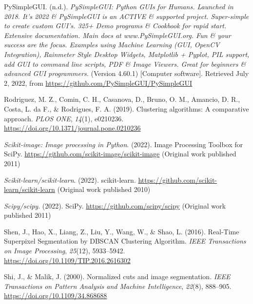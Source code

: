 \documentclass[
  12pt,
]{book}
\newlength{\cslhangindent}
\newlength{\cslentryspacingunit} %
\newenvironment{CSLReferences}[2] %
 {%
  \setlength{\parindent}{0pt}
  \ifodd #1
  \let\oldpar\par
  \def\par{\hangindent=\cslhangindent\oldpar}
  \fi
  \setlength{\parskip}{#2\cslentryspacingunit}
 }%
 {}
\begin{document}
\begin{CSLReferences}{1}{0}
\leavevmode{}%
PySimpleGUI. (n.d.). \emph{{PySimpleGUI}: {Python GUIs} for {Humans}. {Launched} in 2018. {It}'s 2022 \& {PySimpleGUI} is an {ACTIVE} \& supported project. {Super-simple} to create custom {GUI}'s. 325+ {Demo} programs \& {Cookbook} for rapid start. {Extensive} documentation. {Main} docs at www.{PySimpleGUI}.org. {Fun} \& your success are the focus. {Examples} using {Machine Learning} ({GUI}, {OpenCV Integration}), {Rainmeter Style Desktop Widgets}, {Matplotlib} + {Pyplot}, {PIL} support, add {GUI} to command line scripts, {PDF} \& {Image Viewers}. {Great} for beginners \& advanced {GUI} programmers.} (Version 4.60.1) {[}Computer software{]}. Retrieved July 2, 2022, from \url{https://github.com/PySimpleGUI/PySimpleGUI}

\leavevmode{}%
Rodriguez, M. Z., Comin, C. H., Casanova, D., Bruno, O. M., Amancio, D. R., Costa, L. da F., \& Rodrigues, F. A. (2019). Clustering algorithms: {A} comparative approach. \emph{PLOS ONE}, \emph{14}(1), e0210236. \url{https://doi.org/10.1371/journal.pone.0210236}

\leavevmode{}%
\emph{Scikit-image: {Image} processing in {Python}}. (2022). {Image Processing Toolbox for SciPy}. \url{https://github.com/scikit-image/scikit-image} (Original work published 2011)

\leavevmode{}%
\emph{Scikit-learn/scikit-learn}. (2022). {scikit-learn}. \url{https://github.com/scikit-learn/scikit-learn} (Original work published 2010)

\leavevmode{}%
\emph{Scipy/scipy}. (2022). {SciPy}. \url{https://github.com/scipy/scipy} (Original work published 2011)

\leavevmode{}%
Shen, J., Hao, X., Liang, Z., Liu, Y., Wang, W., \& Shao, L. (2016). Real-{Time Superpixel Segmentation} by {DBSCAN Clustering Algorithm}. \emph{IEEE Transactions on Image Processing}, \emph{25}(12), 5933--5942. \url{https://doi.org/10.1109/TIP.2016.2616302}

\leavevmode{}%
Shi, J., \& Malik, J. (2000). Normalized cuts and image segmentation. \emph{IEEE Transactions on Pattern Analysis and Machine Intelligence}, \emph{22}(8), 888--905. \url{https://doi.org/10.1109/34.868688}


\end{CSLReferences}
\end{document}
